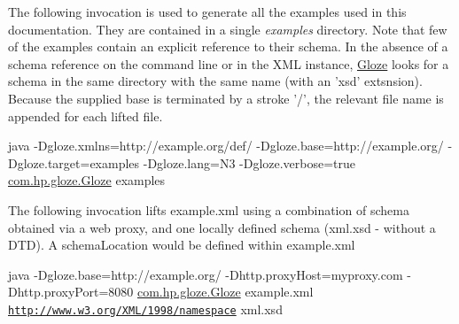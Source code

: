The following invocation is used to generate all the examples used in this documentation. They are contained in a single {\itshape examples\/} directory. Note that few of the examples contain an explicit reference to their schema. In the absence of a schema reference on the command line or in the XML instance, \hyperlink{classcom_1_1hp_1_1gloze_1_1_gloze}{Gloze} looks for a schema in the same directory with the same name (with an 'xsd' extsnsion). Because the supplied base is terminated by a stroke '/', the relevant file name is appended for each lifted file.

{\ttfamily java -\/Dgloze.xmlns=http://example.org/def/ -\/Dgloze.base=http://example.org/ -\/Dgloze.target=examples -\/Dgloze.lang=N3 -\/Dgloze.verbose=true \hyperlink{classcom_1_1hp_1_1gloze_1_1_gloze}{com.hp.gloze.Gloze} examples}

The following invocation lifts example.xml using a combination of schema obtained via a web proxy, and one locally defined schema (xml.xsd -\/ without a DTD). A schemaLocation would be defined within example.xml

{\ttfamily java -\/Dgloze.base=http://example.org/ -\/Dhttp.proxyHost=myproxy.com -\/Dhttp.proxyPort=8080 \hyperlink{classcom_1_1hp_1_1gloze_1_1_gloze}{com.hp.gloze.Gloze} example.xml \href{http://www.w3.org/XML/1998/namespace}{\tt http://www.w3.org/XML/1998/namespace} xml.xsd} 